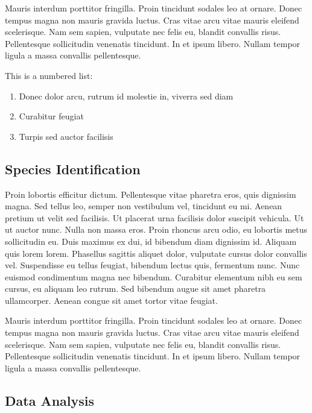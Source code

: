 \documentclass[
	a4paper, %
	10pt, %
	unnumberedsections, %
	twoside, %
]{LTJournalArticle}
\begin{document}
Mauris interdum porttitor fringilla. Proin tincidunt sodales leo at ornare. Donec tempus magna non mauris gravida luctus. Cras vitae arcu vitae mauris eleifend scelerisque. Nam sem sapien, vulputate nec felis eu, blandit convallis risus. Pellentesque sollicitudin venenatis tincidunt. In et ipsum libero. Nullam tempor ligula a massa convallis pellentesque.

This is a numbered list:

\begin{enumerate}
	\item Donec dolor arcu, rutrum id molestie in, viverra sed diam
	\item Curabitur feugiat
	\item Turpis sed auctor facilisis
\end{enumerate}

\subsection{Species Identification}

Proin lobortis efficitur dictum. Pellentesque vitae pharetra eros, quis dignissim magna. Sed tellus leo, semper non vestibulum vel, tincidunt eu mi. Aenean pretium ut velit sed facilisis. Ut placerat urna facilisis dolor suscipit vehicula. Ut ut auctor nunc. Nulla non massa eros. Proin rhoncus arcu odio, eu lobortis metus sollicitudin eu. Duis maximus ex dui, id bibendum diam dignissim id. Aliquam quis lorem lorem. Phasellus sagittis aliquet dolor, vulputate cursus dolor convallis vel. Suspendisse eu tellus feugiat, bibendum lectus quis, fermentum nunc. Nunc euismod condimentum magna nec bibendum. Curabitur elementum nibh eu sem cursus, eu aliquam leo rutrum. Sed bibendum augue sit amet pharetra ullamcorper. Aenean congue sit amet tortor vitae feugiat.

Mauris interdum porttitor fringilla. Proin tincidunt sodales leo at ornare. Donec tempus magna non mauris gravida luctus. Cras vitae arcu vitae mauris eleifend scelerisque. Nam sem sapien, vulputate nec felis eu, blandit convallis risus. Pellentesque sollicitudin venenatis tincidunt. In et ipsum libero. Nullam tempor ligula a massa convallis pellentesque.

\subsection{Data Analysis}
\end{document}
